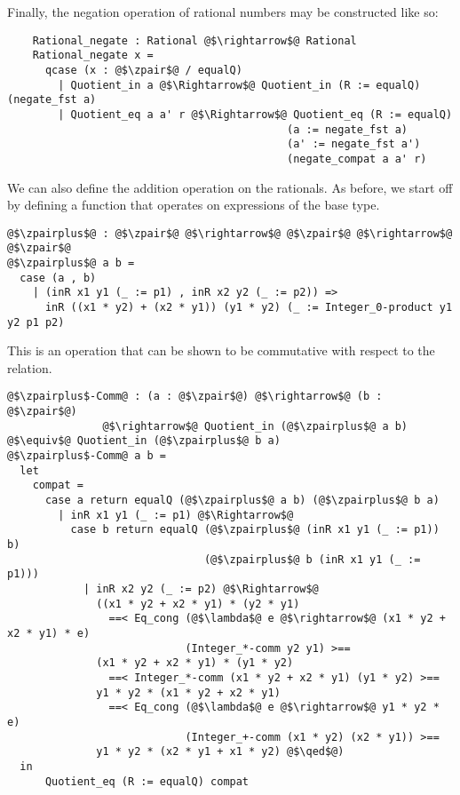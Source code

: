 \documentclass[12pt,twoside,maitrise]{dms}
\theoremstyle{definition}
\numberwithin{equation}{section}
\numberwithin{table}{chapter}
\numberwithin{figure}{chapter}
\renewcommand\qed{\blacksquare}
\begin{document}
Finally, the negation operation of rational numbers may be constructed like so:

\begin{verbatim}
    Rational_negate : Rational @$\rightarrow$@ Rational
    Rational_negate x =
      qcase (x : @$\zpair$@ / equalQ)
        | Quotient_in a @$\Rightarrow$@ Quotient_in (R := equalQ) (negate_fst a)
        | Quotient_eq a a' r @$\Rightarrow$@ Quotient_eq (R := equalQ)
                                            (a := negate_fst a)
                                            (a' := negate_fst a')
                                            (negate_compat a a' r)
\end{verbatim}

We can also define the addition operation on the rationals. As before, we start
off by defining a function that operates on expressions of the base type.

\begin{verbatim}
@$\zpairplus$@ : @$\zpair$@ @$\rightarrow$@ @$\zpair$@ @$\rightarrow$@ @$\zpair$@
@$\zpairplus$@ a b =
  case (a , b)
    | (inR x1 y1 (_ := p1) , inR x2 y2 (_ := p2)) =>
      inR ((x1 * y2) + (x2 * y1)) (y1 * y2) (_ := Integer_0-product y1 y2 p1 p2)
\end{verbatim}

This is an operation that can be shown to be commutative with respect to the
relation.

\begin{verbatim}
@$\zpairplus$-Comm@ : (a : @$\zpair$@) @$\rightarrow$@ (b : @$\zpair$@)
               @$\rightarrow$@ Quotient_in (@$\zpairplus$@ a b) @$\equiv$@ Quotient_in (@$\zpairplus$@ b a)
@$\zpairplus$-Comm@ a b =
  let
    compat =
      case a return equalQ (@$\zpairplus$@ a b) (@$\zpairplus$@ b a)
        | inR x1 y1 (_ := p1) @$\Rightarrow$@
          case b return equalQ (@$\zpairplus$@ (inR x1 y1 (_ := p1)) b)
                               (@$\zpairplus$@ b (inR x1 y1 (_ := p1)))
            | inR x2 y2 (_ := p2) @$\Rightarrow$@
              ((x1 * y2 + x2 * y1) * (y2 * y1)
                ==< Eq_cong (@$\lambda$@ e @$\rightarrow$@ (x1 * y2 + x2 * y1) * e)
                            (Integer_*-comm y2 y1) >==
              (x1 * y2 + x2 * y1) * (y1 * y2)
                ==< Integer_*-comm (x1 * y2 + x2 * y1) (y1 * y2) >==
              y1 * y2 * (x1 * y2 + x2 * y1)
                ==< Eq_cong (@$\lambda$@ e @$\rightarrow$@ y1 * y2 * e)
                            (Integer_+-comm (x1 * y2) (x2 * y1)) >==
              y1 * y2 * (x2 * y1 + x1 * y2) @$\qed$@)
  in
      Quotient_eq (R := equalQ) compat
\end{verbatim}
\end{document}
